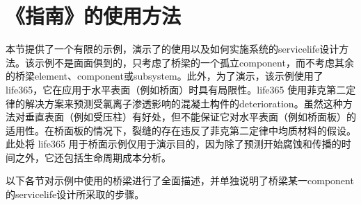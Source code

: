 \section{《指南》的使用方法}

本节提供了一个有限的示例，演示了的使用以及如何实施系统的\gls*{servicelife}设计方法。该示例不是面面俱到的，只考虑了桥梁的一个孤立\gls*{component}，而不考虑其余的桥梁\gls*{element}、\gls*{component}或\gls*{subsystem}。此外，为了演示，该示例使用了 \gls{life365}，它在应用于水平表面（例如桥面）时具有局限性。\gls{life365} 使用菲克第二定律的解决方案来预测受氯离子渗透影响的混凝土构件的\gls*{deterioration}。虽然这种方法对垂直表面（例如受压柱）有好处，但不能保证它对水平表面（例如桥面板）的适用性。在桥面板的情况下，裂缝的存在违反了菲克第二定律中均质材料的假设。此处将 \gls{life365} 用于桥面示例仅用于演示目的，因为除了预测开始腐蚀和传播的时间之外，它还包括生命周期成本分析。

以下各节对示例中使用的桥梁进行了全面描述，并单独说明了桥梁某一\gls{component}的\gls{servicelife}设计所采取的步骤。

